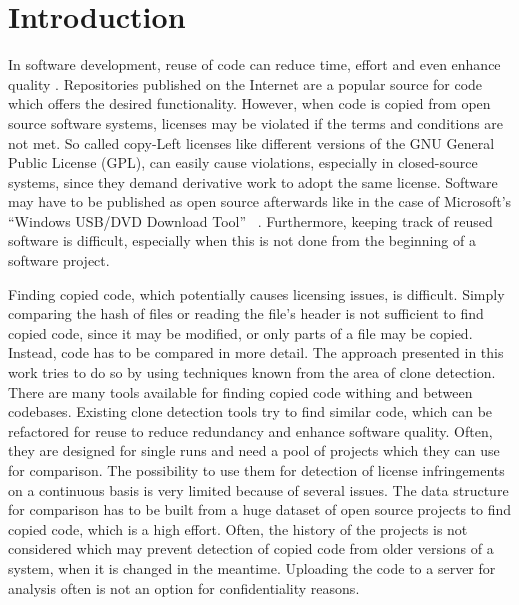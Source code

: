 
\chapter{Introduction}\label{chapter:introduction}
In software development, reuse of code can reduce time, effort and even enhance quality \cite{krueger1992software}.
Repositories published on the Internet are a popular source for code which offers the desired functionality.
However, when code is copied from open source software systems, licenses may be violated if the terms and conditions are not met.
So called copy-Left licenses like different versions of the GNU General Public License (GPL), can easily cause violations, especially in closed-source systems, since they demand derivative work to adopt the same license.
Software may have to be published as open source afterwards like in the case of Microsoft's ``Windows USB/DVD Download Tool'' \ \cite{microsoft2009download}.
Furthermore, keeping track of reused software is difficult, especially when this is not done from the beginning of a software project.

Finding copied code, which potentially causes licensing issues, is difficult.
Simply comparing the hash of files or reading the file's header is not sufficient to find copied code, since it may be modified, or only parts of a file may be copied.
Instead, code has to be compared in more detail.
The approach presented in this work tries to do so by using techniques known from the area of clone detection.
There are many tools available for finding copied code withing and between codebases.
Existing clone detection tools try to find similar code, which can be refactored for reuse to reduce redundancy and enhance software quality.
Often, they are designed for single runs and need a pool of projects which they can use for comparison.
The possibility to use them for detection of license infringements on a continuous basis is very limited because of several issues.
The data structure for comparison has to be built from a huge dataset of open source projects to find copied code, which is a high effort.
Often, the history of the projects is not considered which may prevent detection of copied code from older versions of a system, when it is changed in the meantime.
Uploading the code to a server for analysis often is not an option for confidentiality reasons.

